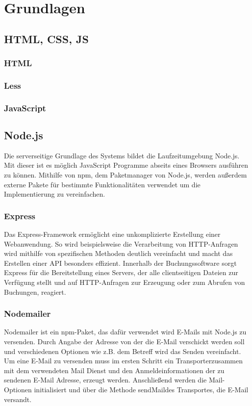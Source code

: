 \chapter{Grundlagen}

\section{HTML, CSS, JS}
\subsection{HTML}
\subsection{Less}
\subsection{JavaScript}

\section{Node.js}
Die serverseitige Grundlage des Systems bildet die Laufzeitumgebung Node.js. Mit dieser ist es möglich JavaScript Programme abseits eines Browsers ausführen zu können. Mithilfe von \glqq npm\grqq, dem Paketmanager von Node.js, werden außerdem externe Pakete für bestimmte Funktionalitäten verwendet um die Implementierung zu vereinfachen.

\subsection{Express}
Das Express-Framework ermöglicht eine unkomplizierte Erstellung einer Webanwendung. So wird beispielsweise die Verarbeitung von HTTP-Anfragen wird mithilfe von spezifischen Methoden deutlich vereinfacht und macht das Erstellen einer API besonders effizient. Innerhalb der Buchungssoftware sorgt Express für die Bereitstellung eines Servers, der alle clientseitigen Dateien zur Verfügung stellt und auf HTTP-Anfragen zur Erzeugung oder zum Abrufen von Buchungen, reagiert.

\subsection{Nodemailer}
Nodemailer ist ein \glqq npm\grqq-Paket, das dafür verwendet wird E-Mails mit Node.js zu versenden. Durch Angabe der Adresse von der die E-Mail verschickt werden soll und verschiedenen Optionen wie z.B. dem Betreff wird das Senden vereinfacht. Um eine E-Mail zu versenden muss im ersten Schritt ein \glqq Transporter\grqq zusammen mit dem verwendeten Mail Dienst und den Anmeldeinformationen der zu sendenen E-Mail Adresse, erzeugt werden. Anschließend werden die Mail-Optionen initialisiert und über die Methode \glqq sendMail\grqq des Transportes, die E-Mail versandt.

